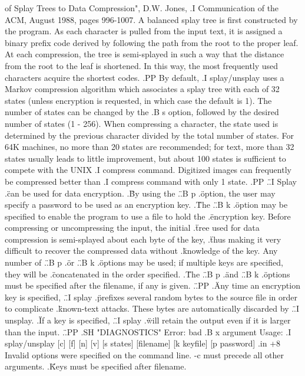 of Splay Trees to Data Compression", D.W. Jones,
.I Communication of the ACM,
August 1988, pages 996-1007.  A balanced splay tree is first constructed by the
program.  As each character is pulled from the input text, it is assigned a
binary prefix code derived by following the path from the root to the proper
leaf.  At each compression, the tree is semi-splayed in such a way
that the distance from the root to the leaf is shortened.
In this way, the most frequently used characters acquire the shortest codes.
.PP
By default,
.I splay/unsplay
uses a Markov compression algorithm which associates a splay tree with each
of 32 states (unless encryption is requested, in which case the default is 1).
The number of states can be changed by the
.B \-s
option, followed by the desired number of states (1 - 256).
When compressing a character, the state used is determined
by the previous character divided by the total number of states.
For 64K machines, no more than 20 states are recommended; for text,
more than 32 states usually leads to little improvement, but about 100 states
is sufficient to compete with the UNIX
.I compress
command.  Digitized images can frequently be compressed better than
.I compress
command with only 1 state.
.PP
.\" .I Splay
.\" can be used for data encryption.
.\" By using the
.\" .B \-p
.\" option, the user may specify a password to be used as an encryption key.
.\" The
.\" .B \-k
.\" option may be specified to enable the program to use a file to hold the
.\" encryption key.  Before compressing or uncompressing the input, the initial
.\" tree used for data compression is semi-splayed about each byte of the key,
.\" thus making it very difficult to recover the compressed data without
.\" knowledge of the key.  Any number of
.\" .B \-p
.\" or
.\" .B \-k
.\" options may be used; if multiple keys are specified, they will be
.\" concatenated in the order specified.
.\" The
.\" .B \-p
.\" and
.\" .B \-k
.\" options must be specified after the filename, if any is given.
.\" .PP
.\" Any time an encryption key is specified,
.\" .I splay
.\" prefixes several random bytes to the source file in order to complicate
.\" known-text attacks.  These bytes are automatically discarded by
.\" .I unsplay.
.\" If a key is specified,
.\" .I splay
.\" will retain the output even if it is larger than the input.
.\" .PP
.SH "DIAGNOSTICS"
Error: bad
.B \-x
argument
Usage:
.I splay/unsplay
[\-c] [\-f] [\-n] [\-v] [\-s states] [filename] [\-k keyfile] [\-p password]
.in +8
Invalid options were specified on the command line.
-c must precede all other arguments.
.\" Keys must be specified after filename.
